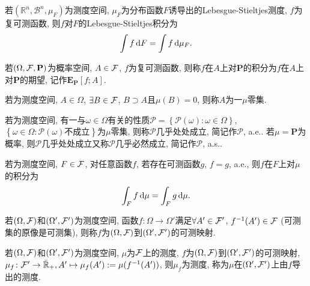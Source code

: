 \begin{definition}
    若$(\mathbb{R}^n,{\mathscr{B}}^n,\mu_F)$为测度空间, $\mu_F$为分布函数$F$诱导出的Lebesgue-Stieltjes测度, $f$为复可测函数, 则$f$对$F$的Lebesgue-Stieltjes积分为
    \begin{equation}
        \int f\,\mathrm{d} F=\int f\,\mathrm{d} \mu_F.
    \end{equation}
\end{definition}

\begin{definition}
    若$(\Omega,\mathcal{F},\mathbf{P})$为概率空间, $A\in\mathcal{F}$, $f$为复可测函数, 则称$f$在$A$上对$\mathbf{P}$的积分为$f$在$A$上对$\mathbf{P}$的期望, 记作$\mathbf{E}_{\mathbf{P}}[f;A]$.
\end{definition}

\begin{definition}
    若\s{}为测度空间, $A\in\Omega$, $\exists  B\in\mathcal{F}$, $B\supset A$且$\mu(B)=0$, 则称$A$为一$\mu$零集.
\end{definition}

\begin{definition}
    若\s{}为测度空间, 有一与$\omega\in\Omega$有关的性质$\mathscr{P}=\left\{\mathscr{P}(\omega)\colon \omega\in\Omega\right\}$, $\left\{\omega\in\Omega\colon \mathscr{P}(\omega)\text{不成立}\right\}$为$\mu$零集, 则称$\mathscr{P}$几乎处处成立, 简记作$\mathscr{P}$, a.e.. 若$\mu=\mathbf{P}$为概率, 则$\mathscr{P}$几乎处处成立又称$\mathscr{P}$几乎必然成立, 简记作$\mathscr{P}$, a.s..
\end{definition}

\begin{definition}
    若\s{}为测度空间, $F\in\mathcal{F}$, 对任意函数$f$, 若存在可测函数$g$, $f=g$, a.e., 则$f$在$F$上对$\mu$的积分为
    \begin{equation}
        \int_{F}f\,\mathrm{d}\mu=\int_{F}g\,\mathrm{d}\mu.
    \end{equation}
\end{definition}

\begin{definition}
    若$(\Omega,\mathcal{F})$和$(\Omega',\mathcal{F}')$为测度空间, 函数$f\colon \Omega\to\Omega'$满足$\forall A' \in \mathcal{F}'$, $f^{-1}(A')\in\mathcal{F}$ (可测集的原像是可测集), 则称$f$为$(\Omega,\mathcal{F})$到$(\Omega',\mathcal{F}')$的可测映射.
\end{definition}

\begin{definition}
    若$(\Omega,\mathcal{F})$和$(\Omega',\mathcal{F}')$为测度空间, $\mu$为$\mathcal{F}$上的测度, $f$为$(\Omega,\mathcal{F})$到$(\Omega',\mathcal{F}')$的可测映射, $\mu_f\colon \mathcal{F}'\to \bar{\mathbb{R}}_+,A'\mapsto\mu_f(A'):=\mu(f^{-1}(A'))$, 则$\mu_f$为测度, 称为$\mu$在$(\Omega',\mathcal{F}')$上由$f$导出的测度.
\end{definition}

